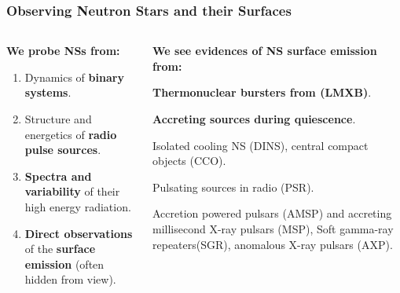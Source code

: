 \begin{frame}
\frametitle{Observing Neutron Stars and their Surfaces} 

\begin{columns}[c]
\begin{column}{0.55\textwidth} 
	{\bf \center We probe NSs from:}{\scriptsize
	 \begin{enumerate}
	     \item Dynamics of {\bf binary systems}.
	     \item Structure and energetics of {\bf radio pulse sources}.
	     \item {\bf Spectra and variability} of their high energy radiation.
	     \item {\bf Direct observations} of the {\bf  surface emission} (often hidden from view).
	     	    \end{enumerate}
}
\end{column}
\begin{column}{0.55\textwidth}    
{\bf \center We see evidences of NS surface emission from:}
\begin{itemize}\scriptsize{
		 \item {\bf Thermonuclear bursters from (LMXB)}.
		 \item {\bf Accreting sources during quiescence}. {\tiny
		 \item Isolated cooling NS (DINS), central compact objects (CCO).
		 \item Pulsating sources in radio (PSR).
		 \item Accretion powered pulsars (AMSP) and accreting millisecond X-ray pulsars (MSP), Soft gamma-ray repeaters(SGR), anomalous X-ray pulsars (AXP).}}
	  \end{itemize}
	  \end{column}
\end{columns}

\end{frame}




